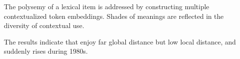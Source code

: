 
The polysemy of a lexical item is addressed by constructing multiple contextualized token embeddings. Shades of meanings are reflected in the diversity of contextual use.

The results indicate that \jia enjoy far global distance but low local distance, and suddenly rises during 1980s.

